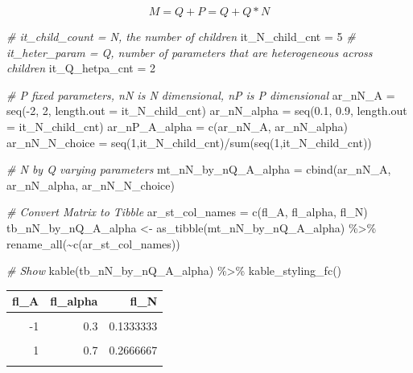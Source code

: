 \documentclass[
]{book}
\newenvironment{Shaded}{\begin{snugshade}}{\end{snugshade}}
\newcommand{\AttributeTok}[1]{\textcolor[rgb]{0.77,0.63,0.00}{#1}}
\newcommand{\CommentTok}[1]{\textcolor[rgb]{0.56,0.35,0.01}{\textit{#1}}}
\newcommand{\DecValTok}[1]{\textcolor[rgb]{0.00,0.00,0.81}{#1}}
\newcommand{\FloatTok}[1]{\textcolor[rgb]{0.00,0.00,0.81}{#1}}
\newcommand{\FunctionTok}[1]{\textcolor[rgb]{0.00,0.00,0.00}{#1}}
\newcommand{\NormalTok}[1]{#1}
\newcommand{\OtherTok}[1]{\textcolor[rgb]{0.56,0.35,0.01}{#1}}
\newcommand{\SpecialCharTok}[1]{\textcolor[rgb]{0.00,0.00,0.00}{#1}}
\newcommand{\StringTok}[1]{\textcolor[rgb]{0.31,0.60,0.02}{#1}}
\begin{document}
\[M = Q+P = Q + Q*N\]

\begin{Shaded}
\begin{Highlighting}[]
\CommentTok{\# it\_child\_count = N, the number of children}
\NormalTok{it\_N\_child\_cnt }\OtherTok{=} \DecValTok{5}
\CommentTok{\# it\_heter\_param = Q, number of parameters that are heterogeneous across children}
\NormalTok{it\_Q\_hetpa\_cnt }\OtherTok{=} \DecValTok{2}

\CommentTok{\# P fixed parameters, nN is N dimensional, nP is P dimensional}
\NormalTok{ar\_nN\_A }\OtherTok{=} \FunctionTok{seq}\NormalTok{(}\SpecialCharTok{{-}}\DecValTok{2}\NormalTok{, }\DecValTok{2}\NormalTok{, }\AttributeTok{length.out =}\NormalTok{ it\_N\_child\_cnt)}
\NormalTok{ar\_nN\_alpha }\OtherTok{=} \FunctionTok{seq}\NormalTok{(}\FloatTok{0.1}\NormalTok{, }\FloatTok{0.9}\NormalTok{, }\AttributeTok{length.out =}\NormalTok{ it\_N\_child\_cnt)}
\NormalTok{ar\_nP\_A\_alpha }\OtherTok{=} \FunctionTok{c}\NormalTok{(ar\_nN\_A, ar\_nN\_alpha)}
\NormalTok{ar\_nN\_N\_choice }\OtherTok{=} \FunctionTok{seq}\NormalTok{(}\DecValTok{1}\NormalTok{,it\_N\_child\_cnt)}\SpecialCharTok{/}\FunctionTok{sum}\NormalTok{(}\FunctionTok{seq}\NormalTok{(}\DecValTok{1}\NormalTok{,it\_N\_child\_cnt))}

\CommentTok{\# N by Q varying parameters}
\NormalTok{mt\_nN\_by\_nQ\_A\_alpha }\OtherTok{=} \FunctionTok{cbind}\NormalTok{(ar\_nN\_A, ar\_nN\_alpha, ar\_nN\_N\_choice)}

\CommentTok{\# Convert Matrix to Tibble}
\NormalTok{ar\_st\_col\_names }\OtherTok{=} \FunctionTok{c}\NormalTok{(}\StringTok{\textquotesingle{}fl\_A\textquotesingle{}}\NormalTok{, }\StringTok{\textquotesingle{}fl\_alpha\textquotesingle{}}\NormalTok{, }\StringTok{\textquotesingle{}fl\_N\textquotesingle{}}\NormalTok{)}
\NormalTok{tb\_nN\_by\_nQ\_A\_alpha }\OtherTok{\textless{}{-}} \FunctionTok{as\_tibble}\NormalTok{(mt\_nN\_by\_nQ\_A\_alpha) }\SpecialCharTok{\%\textgreater{}\%} \FunctionTok{rename\_all}\NormalTok{(}\SpecialCharTok{\textasciitilde{}}\FunctionTok{c}\NormalTok{(ar\_st\_col\_names))}

\CommentTok{\# Show}
\FunctionTok{kable}\NormalTok{(tb\_nN\_by\_nQ\_A\_alpha) }\SpecialCharTok{\%\textgreater{}\%}
  \FunctionTok{kable\_styling\_fc}\NormalTok{()}
\end{Highlighting}
\end{Shaded}

\begin{table}[!h]
\centering
\begin{tabular}{r|r|r}
\hline
fl\_A & fl\_alpha & fl\_N\\
\hline
\cellcolor{gray!6}{-2} & \cellcolor{gray!6}{0.1} & \cellcolor{gray!6}{0.0666667}\\
\hline
-1 & 0.3 & 0.1333333\\
\hline
\cellcolor{gray!6}{0} & \cellcolor{gray!6}{0.5} & \cellcolor{gray!6}{0.2000000}\\
\hline
1 & 0.7 & 0.2666667\\
\hline
\cellcolor{gray!6}{2} & \cellcolor{gray!6}{0.9} & \cellcolor{gray!6}{0.3333333}\\
\hline
\end{tabular}
\end{table}
\end{document}
